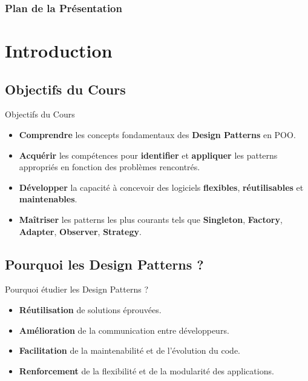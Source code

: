 \documentclass[aspectratio=169]{beamer}
\begin{document}
\begin{frame}
    \titlepage
\end{frame}

\begin{frame}
    \frametitle{Plan de la Présentation}
    \scriptsize
    \tableofcontents[hideallsubsections]
\end{frame}

\section{Introduction}
    \subsection{Objectifs du Cours}

\begin{frame}{Objectifs du Cours}
    \begin{itemize}
        \item \textbf{Comprendre} les concepts fondamentaux des \textbf{Design Patterns} en POO.
        \item \textbf{Acquérir} les compétences pour \textbf{identifier} et \textbf{appliquer} les patterns appropriés en fonction des problèmes rencontrés.
        \item \textbf{Développer} la capacité à concevoir des logiciels \textbf{flexibles}, \textbf{réutilisables} et \textbf{maintenables}.
        \item \textbf{Maîtriser} les patterns les plus courants tels que \textbf{Singleton}, \textbf{Factory}, \textbf{Adapter}, \textbf{Observer}, \textbf{Strategy}.
    \end{itemize}
\end{frame}    
    \subsection{Pourquoi les Design Patterns ?}

\begin{frame}{Pourquoi étudier les Design Patterns ?}
    \begin{itemize}
        \item \textbf{Réutilisation} de solutions éprouvées.
        \item \textbf{Amélioration} de la communication entre développeurs.
        \item \textbf{Facilitation} de la maintenabilité et de l'évolution du code.
        \item \textbf{Renforcement} de la flexibilité et de la modularité des applications.
    \end{itemize}
\end{frame}
\end{document}
